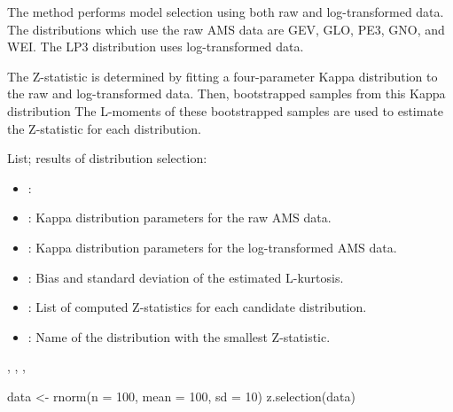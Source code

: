 \documentclass[a4paper]{book}
\begin{document}
%
\begin{Details}
The method performs model selection using both raw and log-transformed data. The
distributions which use the raw AMS data are GEV, GLO, PE3, GNO, and WEI. The LP3
distribution uses log-transformed data.

The Z-statistic is determined by fitting a four-parameter Kappa distribution to the
raw and log-transformed data. Then, bootstrapped samples from this Kappa distribution
The L-moments of these bootstrapped samples are used to estimate the Z-statistic
for each distribution.
\end{Details}
%
\begin{Value}
List; results of distribution selection:
\begin{itemize}

\item{} : 
\item{} : Kappa distribution parameters for the raw AMS data.
\item{} : Kappa distribution parameters for the log-transformed AMS data.
\item{} : Bias and standard deviation of the estimated L-kurtosis.
\item{} : List of computed Z-statistics for each candidate distribution.
\item{} : Name of the distribution with the smallest Z-statistic.

\end{itemize}

\end{Value}
%
\begin{SeeAlso}
, , , 
\end{SeeAlso}
%
\begin{Examples}
\begin{ExampleCode}
data <- rnorm(n = 100, mean = 100, sd = 10)
z.selection(data)

\end{ExampleCode}
\end{Examples}
\printindex{}
\end{document}
